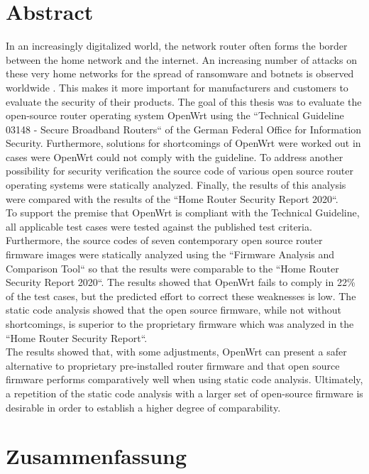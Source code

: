 \documentclass[a4paper]{book}
\begin{document}
\begin{large}
\section*{Abstract}
\begin{onehalfspace} 
In an increasingly digitalized world, the network router often forms the border between the home network and the internet. An increasing number of attacks on these very home networks for the spread of ransomware and botnets is observed worldwide \cite[p.~11-15]{BundesamtfurSicherheitinderInformationstechnik.2020}. This makes it more important for manufacturers and customers to evaluate the security of their products. The goal of this thesis was to evaluate the open-source router operating system OpenWrt using the “Technical Guideline 03148 - Secure Broadband Routers“ of the German Federal Office for Information Security. Furthermore, solutions for shortcomings of OpenWrt were worked out in cases were OpenWrt could not comply with the guideline. To address another possibility for security verification the source code of various open source router operating systems were statically analyzed. Finally, the results of this analysis were compared with the results of the “Home Router Security Report 2020“. \\
\indent To support the premise that OpenWrt is compliant with the Technical Guideline, all applicable test cases were tested against the published test criteria. Furthermore, the source codes of seven contemporary open source router firmware images were statically analyzed using the “Firmware Analysis and Comparison Tool“ so that the results were comparable to the “Home Router Security Report 2020“. The results showed that OpenWrt fails to comply in 22\% of the test cases, but the predicted effort to correct these weaknesses is low. The static code analysis showed that the open source firmware, while not without shortcomings, is superior to the proprietary firmware which was analyzed in the “Home Router Security Report“. \\
\indent The results showed that, with some adjustments, OpenWrt can present a safer alternative to proprietary pre-installed router firmware and that open source firmware performs comparatively well when using static code analysis. Ultimately, a repetition of the static code analysis with a larger set of open-source firmware is desirable in order to establish a higher degree of comparability. 
\end{onehalfspace} 


\clearpage
\section*{Zusammenfassung}
\begin{onehalfspace}  


\end{onehalfspace}
\end{large}
\end{document}
